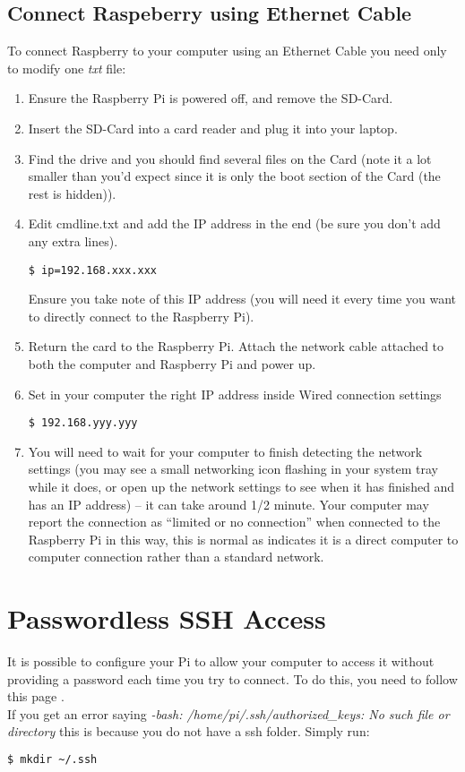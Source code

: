 \documentclass[12pt]{article}%
\begin{document}
	\subsection{Connect Raspeberry using Ethernet Cable}
		To connect Raspberry to your computer using an Ethernet Cable you need only to modify one \textit{txt} file:
		\begin{enumerate}
			\item Ensure the Raspberry Pi is powered off, and remove the SD-Card.
			\item Insert the SD-Card into a card reader and plug it into your laptop.
			\item Find the drive and you should find several files on the Card
			(note it a lot smaller than you’d expect since it is only the boot
			section of the Card (the rest is hidden)).
			\item Edit cmdline.txt and add the IP address in the end (be sure you don’t add any extra lines).
			\begin{lstlisting}
$ ip=192.168.xxx.xxx
			\end{lstlisting}
			Ensure you take note of this IP address (you will need it every time you want to directly connect to the Raspberry Pi).
			\item Return the card to the Raspberry Pi. Attach the network cable attached to both the computer and Raspberry Pi and power up.
			\item Set in your computer the right IP address inside Wired connection settings
			\begin{lstlisting}
$ 192.168.yyy.yyy
			\end{lstlisting}
			\item You will need to wait for your computer to finish detecting the network settings (you may see a small networking icon flashing in your system tray while it does, or open up the network settings to see when it has finished and has an IP address) – it can take around 1/2 minute.  Your computer may report the connection as  “limited or no connection” when connected to the Raspberry Pi in this way, this is normal as indicates it is a direct computer to computer connection rather than a standard network.
		\end{enumerate}

\section{Passwordless SSH Access}
	It is possible to configure your Pi to allow your computer to access it without providing a password each time you try to connect.
	To do this, you need to follow this page \cite{pwd}.\\
	If you get an error saying \textit{-bash: /home/pi/.ssh/authorized\_keys: No such file or directory} this is because you do not have a ssh folder. Simply run:
\begin{lstlisting}[language=Bash]
$ mkdir ~/.ssh
\end{lstlisting}
\end{document}
